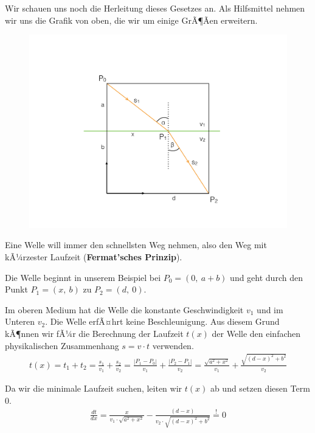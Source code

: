 Wir schauen uns noch die Herleitung dieses Gesetzes an. Als Hilfsmittel nehmen wir uns die Grafik von oben, die wir um einige GrÃ¶Ãen erweitern. 

\begin{figure}[H]
	\centering
	\includegraphics[scale = 0.5]{SeismikBilder/GrafikHerleitung}
\end{figure}
 
Eine Welle will immer den schnellsten Weg nehmen, also den Weg mit kÃ¼rzester Laufzeit (\textbf{Fermat'sches Prinzip}).

Die Welle beginnt in unserem Beispiel bei $P_0 = \left( 0, \ a + b \right)$ und geht durch den Punkt $P_1 = \left( x, \ b \right)$ zu $P_2 = \left( d, \ 0 \right)$.

Im oberen Medium hat die Welle die konstante Geschwindigkeit $v_1$ und im Unteren $v_2$. Die Welle erfÃ¤hrt keine Beschleunigung. Aus diesem Grund kÃ¶nnen wir fÃ¼r die Berechnung der Laufzeit $t(x)$ der Welle den einfachen physikalischen Zusammenhang $s = v \cdot t$ verwenden. \begin{align*}
	t(x) = t_1 + t_2 = \frac{s_1}{v_1} + \frac{s_2}{v_2} = \frac{|P_1 - P_0|}{v_1} + \frac{|P_2 - P_1|}{v_2} = \frac{\sqrt{a^2 + x^2}}{v_1} + \frac{\sqrt{(d - x)^2 + b^2}}{v_2}
\end{align*}

Da wir die minimale Laufzeit suchen, leiten wir $t(x)$ ab und setzen diesen Term 0. \begin{align*}
	\frac{dt}{dx} = \frac{x}{  v_1 \cdot \sqrt{a^2 + x^2}} - \frac{(d - x)}{ v_2 \cdot \sqrt{(d - x)^2 + b^2}} \overset{!}{=} 0
\end{align*}

